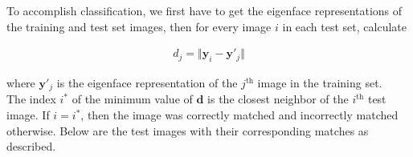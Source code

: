 \begin{homeworkProblem}
  To accomplish classification, we first have to get the eigenface representations of the training
  and test set images, then for every image $i$ in each test set, calculate

  \begin{align*}
    d_j = \Vert \mathbf{y}_i - \mathbf{y}'_{j}\Vert
  \end{align*}

  where $\mathbf{y}'_j$ is the eigenface representation of the $j^\mathrm{th}$ image
  in the training set. \\

  The index $i^*$ of the minimum value of $\mathbf{d}$ is
  the closest neighbor of the $i^\mathrm{th}$ test image. If $i = i^*$, then the
  image was correctly matched and incorrectly matched otherwise. Below are the
  test images with their corresponding matches as described.


\end{homeworkProblem}
